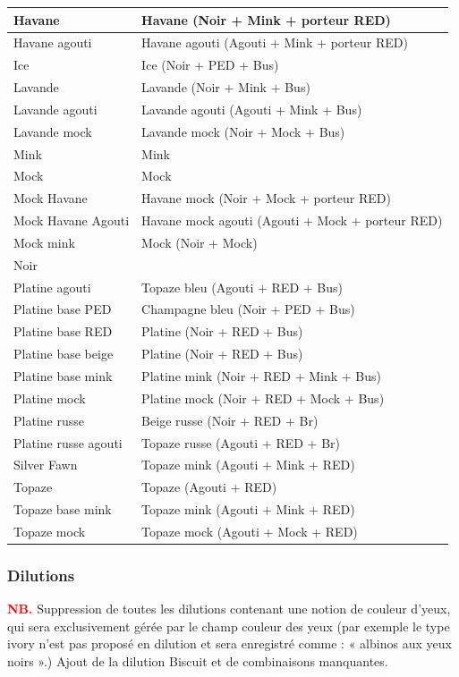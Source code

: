 ﻿\documentclass[a4paper,10pt]{article}
\newcommand\desire[1]{\noindent\textbf{\textcolor{red}{#1}}}
\begin{document}
\begin{center}
\begin{longtable}{|l|l|}
Havane& Havane (Noir + Mink + porteur RED)\\\hline
Havane agouti& Havane agouti (Agouti + Mink + porteur RED)\\\hline
Ice&  Ice (Noir + PED + Bus)\\\hline
Lavande& Lavande (Noir + Mink + Bus)\\\hline
Lavande agouti& Lavande agouti (Agouti + Mink + Bus)\\\hline
Lavande mock& Lavande mock (Noir + Mock + Bus)\\\hline
Mink& Mink \\\hline
Mock& Mock \\\hline
Mock Havane& Havane mock (Noir + Mock + porteur RED)\\\hline
Mock Havane Agouti& Havane mock agouti (Agouti + Mock + porteur RED)\\\hline
Mock mink& Mock (Noir + Mock)\\\hline
Noir& \\\hline
Platine agouti& Topaze bleu (Agouti + RED + Bus)\\\hline
Platine base PED& Champagne bleu (Noir + PED + Bus)\\\hline
Platine base RED& Platine (Noir + RED + Bus)\\\hline
Platine base beige& Platine (Noir + RED + Bus)\\\hline
Platine base mink& Platine mink (Noir + RED + Mink + Bus)\\\hline
Platine mock& Platine mock (Noir + RED + Mock + Bus)\\\hline
Platine russe& Beige russe (Noir + RED + Br)\\\hline
Platine russe agouti& Topaze russe (Agouti + RED + Br)\\\hline
Silver Fawn& Topaze mink (Agouti + Mink + RED)\\\hline
Topaze& Topaze (Agouti + RED)\\\hline
Topaze base mink& Topaze mink (Agouti + Mink + RED)\\\hline
Topaze mock& Topaze mock (Agouti + Mock + RED)\\\hline
\end{longtable}\end{center}

\subsubsection{Dilutions}
\desire{NB.} Suppression de toutes les dilutions contenant une notion de couleur d’yeux, qui sera exclusivement gérée par le champ couleur des yeux (par exemple le type ivory n'est pas proposé en dilution et sera enregistré comme : « albinos aux yeux noirs ».) Ajout de la dilution Biscuit et de combinaisons manquantes.
\end{document}

